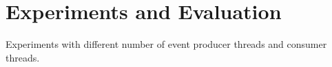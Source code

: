 \section{Experiments and Evaluation}\label{sec:experiments}


Experiments with different number of event producer threads and consumer threads. 



